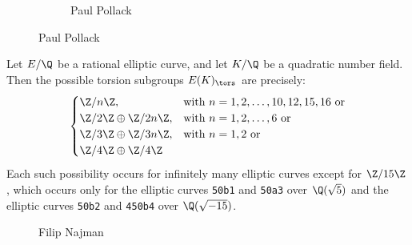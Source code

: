 \begin{frame}[plain]
\begin{figure}[h]
\begin{subfigure}{0.3\textwidth}
	\caption{Paul Pollack}
	\end{subfigure}
	\end{figure}
\end{frame}




\begin{frame}[plain]
\footnotesize
\begin{thm}[Najman, 2015]
Let $E/\Q$ be a rational elliptic curve, and let $K/\Q$ be a quadratic number field. Then the possible torsion subgroups $E(K)_\tors$ are precisely:
	\[
	\begin{cases}
	\Z/n\Z, & \text{with } n= 1, 2, \ldots, 10, 12, 15, 16 \text{ or} \\
	\Z/2\Z \oplus \Z/2n\Z, & \text{with } n= 1, 2, \ldots, 6 \text{ or} \\
	\Z/3\Z \oplus \Z/3n\Z, & \text{with } n= 1, 2 \text{ or} \\
	\Z/4\Z \oplus \Z/4\Z
	\end{cases}
	\]
Each such possibility occurs for infinitely many elliptic curves except for $\Z/15\Z$, which occurs only for the elliptic curves \texttt{50b1} and \texttt{50a3} over $\Q(\sqrt{5})$ and the elliptic curves \texttt{50b2} and \texttt{450b4} over $\Q(\sqrt{-15})$. 
\end{thm}
	\begin{figure}[!ht]
	\centering
	\captionsetup{labelformat=empty}
	\caption{Filip Najman}
	\end{figure}
\end{frame}





